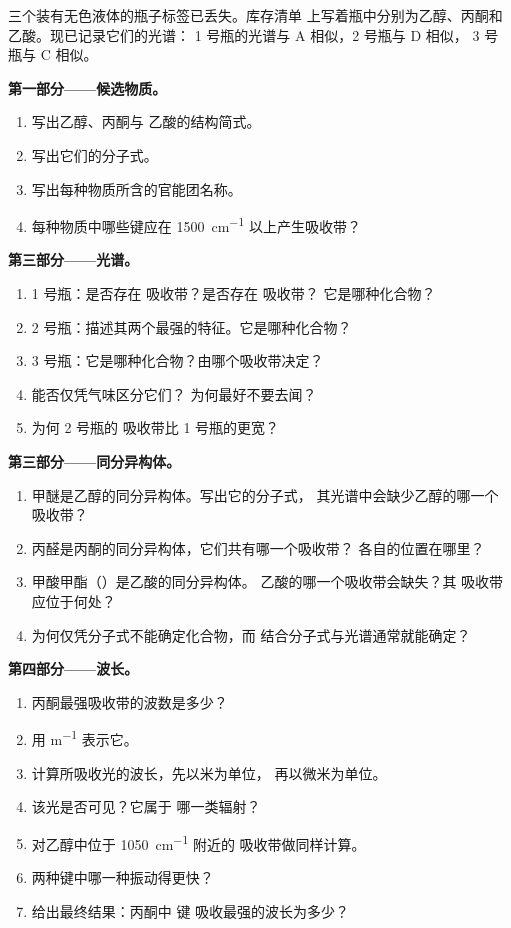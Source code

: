 \begin{problem}
\label{pb:g11:infrared:1}
三个装有无色液体的瓶子标签已丢失。库存清单
上写着瓶中分别为乙醇、丙酮和乙酸。现已记录它们的光谱：
1 号瓶的光谱与 A 相似，2 号瓶与 D 相似，
3 号瓶与 C 相似。

\medskip
\noindent\textbf{第一部分——候选物质。}
\begin{enumerate}
  \item 写出乙醇、丙酮与
        乙酸的结构简式。
  \item 写出它们的分子式。
  \item 写出每种物质所含的官能团名称。
  \item 每种物质中哪些键应在
        \qty{1500}{cm^{-1}} 以上产生吸收带？
\end{enumerate}

\medskip
\noindent\textbf{第三部分——光谱。}
\begin{enumerate}[resume]
  \item 1 号瓶：是否存在  吸收带？是否存在  吸收带？
        它是哪种化合物？
  \item 2 号瓶：描述其两个最强的特征。它是哪种化合物？
  \item 3 号瓶：它是哪种化合物？由哪个吸收带决定？
  \item 能否仅凭气味区分它们？
        为何最好不要去闻？
  \item 为何 2 号瓶的  吸收带比 1 号瓶的更宽？
\end{enumerate}

\medskip
\noindent\textbf{第三部分——同分异构体。}
\begin{enumerate}[resume]
  \item 甲醚是乙醇的同分异构体。写出它的分子式，
        其光谱中会缺少乙醇的哪一个吸收带？
  \item 丙醛是丙酮的同分异构体，它们共有哪一个吸收带？
        各自的位置在哪里？
  \item 甲酸甲酯（）是乙酸的同分异构体。
        乙酸的哪一个吸收带会缺失？其
         吸收带应位于何处？
  \item 为何仅凭分子式不能确定化合物，而
        结合分子式与光谱通常就能确定？
\end{enumerate}

\medskip
\noindent\textbf{第四部分——波长。}
\begin{enumerate}[resume]
  \item 丙酮最强吸收带的波数是多少？
  \item 用 \si{m^{-1}} 表示它。
  \item 计算所吸收光的波长，先以米为单位，
        再以微米为单位。
  \item 该光是否可见？它属于
        哪一类辐射？
  \item 对乙醇中位于
        \qty{1050}{cm^{-1}} 附近的  吸收带做同样计算。
  \item 两种键中哪一种振动得更快？
  \item 给出最终结果：丙酮中  键
        吸收最强的波长为多少？
\end{enumerate}
\end{problem}
